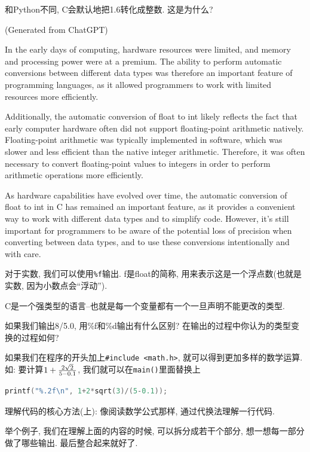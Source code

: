 和Python不同, C会默认地把1.6转化成整数. 这是为什么? 

\begin{pas}
(Generated from ChatGPT)


	In the early days of computing, hardware resources were limited, and memory and processing power were at a premium. The ability to perform automatic conversions between different data types was therefore an important feature of programming languages, as it allowed programmers to work with limited resources more efficiently.

Additionally, the automatic conversion of float to int likely reflects the fact that early computer hardware often did not support floating-point arithmetic natively. Floating-point arithmetic was typically implemented in software, which was slower and less efficient than the native integer arithmetic. Therefore, it was often necessary to convert floating-point values to integers in order to perform arithmetic operations more efficiently.

As hardware capabilities have evolved over time, the automatic conversion of float to int in C has remained an important feature, as it provides a convenient way to work with different data types and to simplify code. However, it's still important for programmers to be aware of the potential loss of precision when converting between data types, and to use these conversions intentionally and with care.
\end{pas}

对于实数, 我们可以使用\texttt{\%f}输出. f是float的简称, 用来表示这是一个浮点数(也就是实数, 因为小数点会``浮动'').  

\begin{bonus}
	C是一个强类型的语言--也就是每一个变量都有一个一旦声明不能更改的类型. 

	如果我们输出8/5.0, 用\%f和\%d输出有什么区别? 在输出的过程中你认为的类型变换的过程如何?
\end{bonus}

如果我们在程序的开头加上\texttt{\#include <math.h>}, 就可以得到更加多样的数学运算. 如: 要计算$1+{2\sqrt 2 \over 5-0.1}$, 我们就可以在\texttt{main(){}}里面替换上

\begin{lstlisting}[language=c]
	printf("%.2f\n", 1+2*sqrt(3)/(5-0.1)); 
\end{lstlisting}


\begin{idea}
	理解代码的核心方法(上): 像阅读数学公式那样, 通过代换法理解一行代码. 
	
	举个例子, 我们在理解上面的内容的时候, 可以拆分成若干个部分, 想一想每一部分做了哪些输出. 最后整合起来就好了. 
	
\end{idea}

